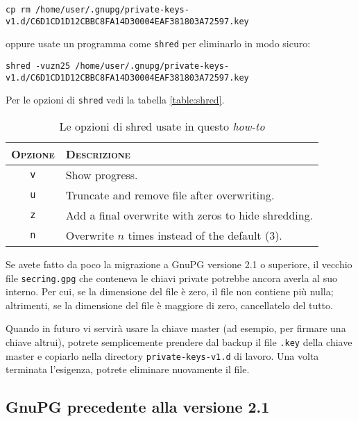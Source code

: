\begin{lstlisting}
cp rm /home/user/.gnupg/private-keys-v1.d/C6D1CD1D12CBBC8FA14D30004EAF381803A72597.key
\end{lstlisting}

oppure usate un programma come \texttt{shred} per eliminarlo in modo
sicuro:

\begin{lstlisting}
shred -vuzn25 /home/user/.gnupg/private-keys-v1.d/C6D1CD1D12CBBC8FA14D30004EAF381803A72597.key
\end{lstlisting}

Per le opzioni di \texttt{shred} vedi la tabella \vref{table:shred}.

\begin{table}
    \centering
    \begin{tabularx}{.6\textwidth}{c l}
        \toprule
        \textsc{Opzione} & \textsc{Descrizione} \\
        \midrule
        \texttt{v} & Show progress. \\
        \texttt{u} & Truncate and remove file after overwriting. \\
        \texttt{z} & Add a final overwrite with zeros to hide shredding. \\
        \texttt{n} & Overwrite $n$ times instead of the default (3). \\
        \bottomrule
    \end{tabularx}
    \caption{Le opzioni di shred usate in questo \textit{how-to}}
    \label{table:shred}
\end{table}

Se avete fatto da poco la migrazione a GnuPG versione 2.1 o superiore, il
vecchio file \texttt{secring.gpg} che conteneva le chiavi private potrebbe
ancora averla al suo interno. Per cui, se la dimensione del file è zero, il file
non contiene più nulla; altrimenti, se la dimensione del file è maggiore di
zero, cancellatelo del tutto.

Quando in futuro vi servirà usare la chiave master (ad esempio, per firmare una
chiave altrui), potrete semplicemente prendere dal backup il file \texttt{.key}
della chiave master e copiarlo nella directory \texttt{private-keys-v1.d} di
lavoro. Una volta terminata l'esigenza, potrete eliminare nuovamente il file.

\subsection{GnuPG precedente alla versione 2.1}

